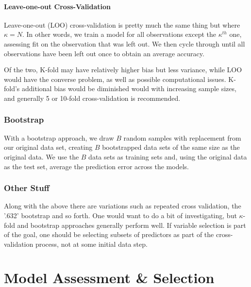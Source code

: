 \documentclass[english,nohyper,titlepage]{tufte-handout}
\begin{document}
\subsection{Leave-one-out Cross-Validation}
Leave-one-out (LOO) cross-validation is pretty much the same thing but where $\kappa=N$.  In other words, we train a model for all observations except the $\kappa^{th}$ one, assessing fit on the observation that was left out. We then cycle through until all observations have been left out once to obtain an average accuracy.  

Of the two, K-fold may have relatively higher bias but less variance, while LOO would have the converse problem, as well as possible computational issues.  K-fold's additional bias would be diminished would with increasing sample sizes, and generally 5 or 10-fold cross-validation is recommended.

\section{Bootstrap}
With a bootstrap approach, we draw $B$ random samples with replacement from our original data set, creating $B$ bootstrapped data sets of the same size as the original data.  We use the $B$ data sets as training sets and, using the original data as the test set, average the prediction error across the models.

\section{Other Stuff}
Along with the above there are variations such as repeated cross validation, the '.632' bootstrap and so forth.  One would want to do a bit of investigating, but $\kappa$-fold and bootstrap approaches generally perform well.  If variable selection is part of the goal, one should be selecting subsets of predictors as part of the cross-validation process, not at some initial data step.








\part{Model Assessment \& Selection}
\end{document}
